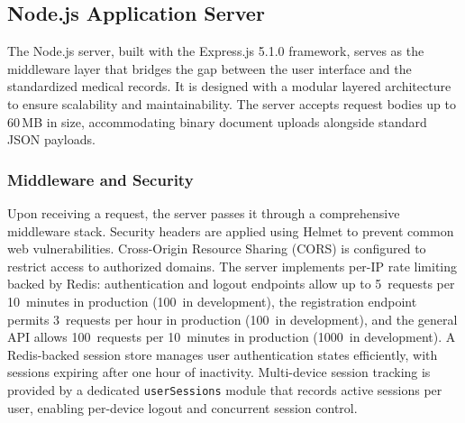 \subsection{Node.js Application Server}

The Node.js server, built with the Express.js 5.1.0 framework, serves as the
middleware layer that bridges the gap between the user interface and the
standardized medical records. It is designed with a modular layered
architecture to ensure scalability and maintainability. The server accepts
request bodies up to 60\,MB in size, accommodating binary document uploads
alongside standard JSON payloads.

\subsubsection{Middleware and Security}
Upon receiving a request, the server passes it through a comprehensive
middleware stack. Security headers are applied using Helmet to prevent common
web vulnerabilities. Cross-Origin Resource Sharing (CORS) is configured to
restrict access to authorized domains. The server implements per-IP rate
limiting backed by Redis: authentication and logout endpoints allow up to
5~requests per 10~minutes in production (100~in development), the registration
endpoint permits 3~requests per hour in production (100~in development), and
the general API allows 100~requests per 10~minutes in production (1000~in
development). A Redis-backed session store manages user authentication states
efficiently, with sessions expiring after one hour of inactivity. Multi-device
session tracking is provided by a dedicated \texttt{userSessions} module that
records active sessions per user, enabling per-device logout and concurrent
session control.

